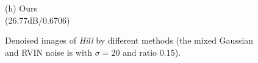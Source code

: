 \documentclass[runningheads]{llncs}
\begin{document}
\begin{figure}
{\begin{minipage}[t]{0.244\textwidth}
{\footnotesize (h) Ours \\(26.77dB/0.6706)}
\end{minipage}
}
\caption{Denoised images of \textsl{Hill} by different methods (the mixed Gaussian and RVIN noise is with $\sigma = 20$ and ratio $0.15$).}
\label{fig13}
\end{figure}

\begin{figure}
\centering
{}
\end{figure}
\end{document}

